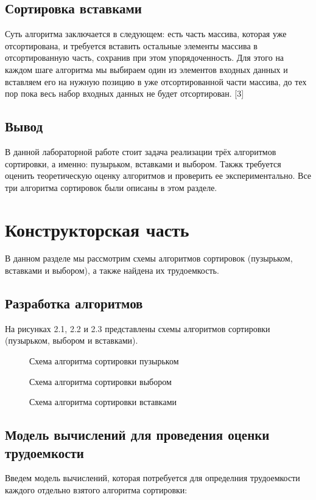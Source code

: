 \documentclass[a4paper,14pt, unknownkeysallowed]{extreport}
\newcommand{\img}[3] {
	\begin{figure}[h!]
		\center{\texttt{[image: img/\#2]}}
		\caption{#3}
		\label{img:#2}
	\end{figure}
}
\begin{document}
\section{Сортировка вставками}

Суть алгоритма заключается в следующем: есть часть массива, которая уже отсортирована, и требуется вставить остальные элементы массива в отсортированную часть, сохранив при этом упорядоченность. Для этого на каждом шаге алгоритма мы выбираем один из элементов входных данных и вставляем его на нужную позицию в уже отсортированной части массива, до тех пор пока весь набор входных данных не будет отсортирован. [3]

\section{Вывод}

В данной лабораторной работе стоит задача реализации трёх алгоритмов сортировки, а именно: пузырьком, вставками и выбором. Такжк требуется оценить теоретическую оценку алгоритмов и проверить ее экспериментально. Все три алгоритма сортировок были описаны в этом разделе.





\chapter{Конструкторская часть}
В данном разделе мы рассмотрим схемы алгоритмов сортировок (пузырьком, вставками и выбором), а также найдена их трудоемкость.

\section{Разработка алгоритмов}
На рисунках 2.1, 2.2 и 2.3 представлены схемы алгоритмов сортировки (пузырьком, выбором и вставками).

\img{170mm}{bubble_sort_scheme.drawio.png}{Схема алгоритма сортировки пузырьком}
\img{220mm}{select_sort_scheme.drawio.png}{Схема алгоритма сортировки выбором}
\img{220mm}{insertion_sort_scheme.drawio.png}{Схема алгоритма сортировки вставками}

\clearpage

\section{Модель вычислений для проведения оценки трудоемкости}
Введем модель вычислений, которая потребуется для определния трудоемкости каждого отдельно взятого алгоритма сортировки:
\end{document}

